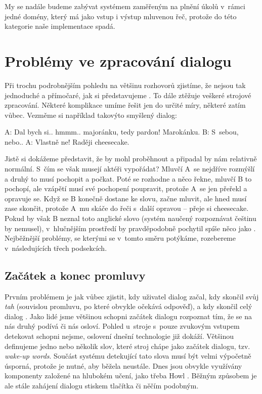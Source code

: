 My se nadále budeme zabývat systémem zaměřeným na plnění úkolů v~rámci jedné
domény, který má jako vstup i výstup mluvenou řeč, protože do této kategorie
naše implementace spadá.

\section{Problémy ve zpracování dialogu}

Při trochu podrobnějším pohledu na většinu rozhovorů zjistíme, že nejsou
tak jednoduché a přímočaré, jak si představujeme \citep[sekce 24.1]{jurafsky_slp_2020}. To dále ztěžuje
veškeré strojové zpracování. Některé komplikace umíme řešit jen do určité
míry, některé zatím vůbec. Vezměme si například takovýto smyšlený dialog:

\begin{code}
    A: Dal bych si.. hmmm.. majoránku, tedy pardon! Marokánku.
    B: S~sebou, nebo..
    A: Vlastně ne! Raději cheesecake.
\end{code}

Jistě si dokážeme představit, že by mohl proběhnout a připadal by nám
relativně normální. S~čím se však musejí aktéři vypořádat? Mluvčí A~se
nejdříve rozmýšlí a druhý to musí pochopit a počkat. Poté se rozhodne
a něco řekne, mluvčí B to pochopí, ale vzápětí musí své pochopení
poupravit, protože A~se jen přeřekl a opravuje se. Když se B konečně
dostane ke slovu, začne mluvit, ale hned musí zase skončit, protože
A~mu skáče do řeči s~další opravou -- přeje si cheesecake. Pokud by
však B neznal toto anglické slovo (systém naučený rozpoznávat češtinu
by nemusel), v~hlučnějším prostředí by pravděpodobně pochytil spíše
něco jako . Nejběžnější problémy, se kterými se v~tomto
směru potýkáme, rozebereme v~následujících třech podsekcích.

\subsection{Začátek a konec promluvy}

Prvním problémem je jak vůbec zjistit, kdy uživatel dialog začal, kdy
skončil svůj \textit{tah} (souvislou promluvu, po které obvykle očekává odpověď),
a kdy skončil celý dialog \citep[strana 494]{jurafsky_slp_2020}.
Jako lidé jsme většinou schopni začátek dialogu rozpoznat tím, že se na
nás druhý podívá či nás osloví. Pohled u~stroje s~pouze zvukovým vstupem
detekovat schopni nejsme, oslovení dnešní technologie již dokáží. Většinou
definujeme jedno nebo několik slov, které stroj chápe jako začátek dialogu,
tzv. \textit{wake-up words}. Součást systému detekující tato slova musí být velmi
výpočetně úsporná, protože je nutné, aby běžela neustále. Dnes jsou obvykle
využívány komponenty založené na hlubokém učení, jako třeba Howl
\citep{tang_howl_2020}.
Běžným způsobem je ale stále zahájení dialogu stiskem tlačítka či něčím
podobným.

